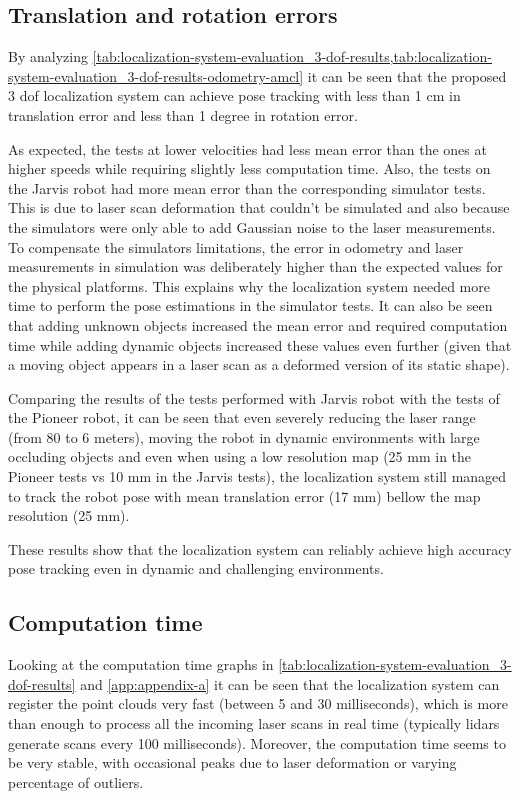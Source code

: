 \subsection{Translation and rotation errors}

By analyzing \cref{tab:localization-system-evaluation_3-dof-results,tab:localization-system-evaluation_3-dof-results-odometry-amcl} it can be seen that the proposed 3 \gls{dof} localization system can achieve pose tracking with less than 1 cm in translation error and less than 1 degree in rotation error.

As expected, the tests at lower velocities had less mean error than the ones at higher speeds while requiring slightly less computation time. Also, the tests on the Jarvis robot had more mean error than the corresponding simulator tests. This is due to laser scan deformation that couldn't be simulated and also because the simulators were only able to add Gaussian noise to the laser measurements. To compensate the simulators limitations, the error in odometry and laser measurements in simulation was deliberately higher than the expected values for the physical platforms. This explains why the localization system needed more time to perform the pose estimations in the simulator tests. It can also be seen that adding unknown objects increased the mean error and required computation time while adding dynamic objects increased these values even further (given that a moving object appears in a laser scan as a deformed version of its static shape).

Comparing the results of the tests performed with Jarvis robot  with the tests of the Pioneer robot, it can be seen that even severely reducing the laser range (from 80 to 6 meters), moving the robot in dynamic environments with large occluding objects and even when using a low resolution map (25 mm in the Pioneer tests vs 10 mm in the Jarvis tests), the localization system still managed to track the robot pose with mean translation error (17 mm) bellow the map resolution (25 mm).

These results show that the localization system can reliably achieve high accuracy pose tracking even in dynamic and challenging environments.


\subsection{Computation time}

Looking at the computation time graphs in \cref{tab:localization-system-evaluation_3-dof-results} and \cref{app:appendix-a} it can be seen that the localization system can register the point clouds very fast (between 5 and 30 milliseconds), which is more than enough to process all the incoming laser scans in real time (typically \glspl{lidar} generate scans every 100 milliseconds). Moreover, the computation time seems to be very stable, with occasional peaks due to laser deformation or varying percentage of outliers.

